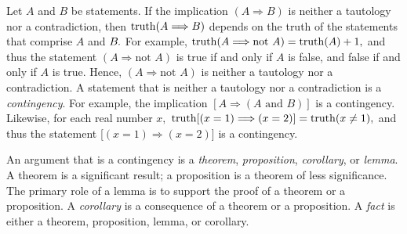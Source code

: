 Let $A$ and $B$ be statements.  If the implication $(A\Longrightarrow B)$ is neither a tautology nor a contradiction, then $\operatorname{truth}(A\Longrightarrow B)$ depends on the truth of the statements that comprise $A$ and $B\mspace{-1mu}.$
For example, $\operatorname{truth}(A\Longrightarrow \mbox{not }A)=\operatorname{truth}(A)+1,$ and thus the statement $(A\Longrightarrow \mbox{not }A)$ is true if and only if $A$ is false, and false if and only if $A$ is true.  Hence, $(A\Longrightarrow \mbox{not }A)$ is neither a tautology nor a contradiction.
A statement that is neither a tautology nor a contradiction is a {\it contingency}.
%
%
For example, the implication $[A\Longrightarrow (A\mbox{ and }B)]$ is a contingency.  Likewise, for each real number $x,$
%
$\operatorname{truth}[(x=1)\Longrightarrow (x=2)]=\operatorname{truth}(x\ne1),$ and thus the statement
%
[$(x=1)\Longrightarrow (x=2)$] is a contingency.
%






An argument that is a contingency is a {\it theorem}, {\it proposition}, {\it corollary}, or {\it lemma}.
%
A theorem is a significant result; a proposition is a theorem of less significance.  The primary role of
a lemma is to support the proof of a theorem or a proposition.
%
%
%
%
%
A {\it corollary} is a consequence of a theorem or a proposition.
A {\it fact} is either a theorem, proposition, lemma, or
corollary.










